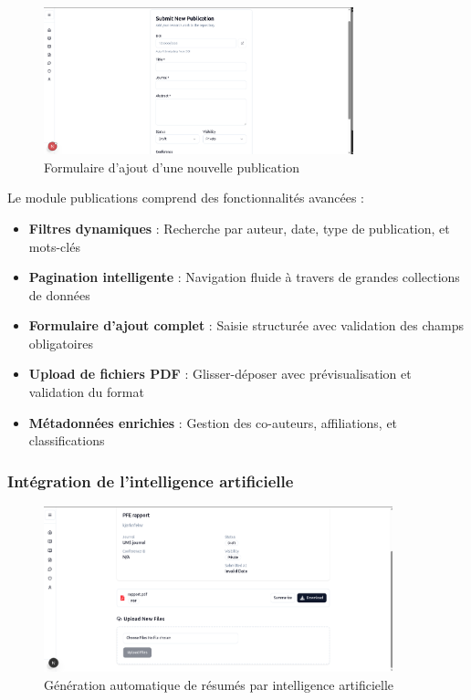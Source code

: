 \documentclass[12pt]{rapportPfe}
\begin{document}
\begin{figure}[H]
    \centering
    \includegraphics[width=0.8\textwidth]{diagrams/a_ss_11.png}
    \caption{Formulaire d'ajout d'une nouvelle publication}
    \label{fig:add_publication}
\end{figure}

Le module publications comprend des fonctionnalités avancées :
\begin{itemize}
    \item \textbf{Filtres dynamiques} : Recherche par auteur, date, type de publication, et mots-clés
    \item \textbf{Pagination intelligente} : Navigation fluide à travers de grandes collections de données
    \item \textbf{Formulaire d'ajout complet} : Saisie structurée avec validation des champs obligatoires
    \item \textbf{Upload de fichiers PDF} : Glisser-déposer avec prévisualisation et validation du format
    \item \textbf{Métadonnées enrichies} : Gestion des co-auteurs, affiliations, et classifications
\end{itemize}

\subsubsection{Intégration de l'intelligence artificielle}

\begin{figure}[H]
    \centering
    \includegraphics[width=0.9\textwidth]{diagrams/a_ss_13.png}
    \caption{Génération automatique de résumés par intelligence artificielle}
    \label{fig:ai_summary}
\end{figure}
\end{document}
